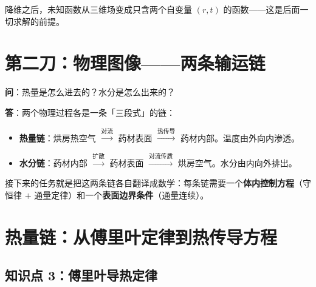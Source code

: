 \documentclass[12pt,a4paper]{ctexart}
\begin{document}
\begin{center}
\end{center}

降维之后，未知函数从三维场变成只含两个自变量 $(r,t)$ 的函数——这是后面一切求解的前提。

\section{第二刀：物理图像——两条输运链}

\textbf{问}：热量是怎么进去的？水分是怎么出来的？

\textbf{答}：两个物理过程各是一条「三段式」的链：

\begin{itemize}[leftmargin=2.5em]
\item \textbf{热量链}：烘房热空气 $\xrightarrow{\text{对流}}$ 药材表面 $\xrightarrow{\text{热传导}}$ 药材内部。温度由外向内渗透。
\item \textbf{水分链}：药材内部 $\xrightarrow{\text{扩散}}$ 药材表面 $\xrightarrow{\text{对流传质}}$ 烘房空气。水分由内向外排出。
\end{itemize}

\begin{center}
\end{center}

接下来的任务就是把这两条链各自翻译成数学：每条链需要一个\textbf{体内控制方程}（守恒律 $+$ 通量定律）和一个\textbf{表面边界条件}（通量连续）。

\section{热量链：从傅里叶定律到热传导方程}

\subsection{知识点 3：傅里叶导热定律}
\end{document}
